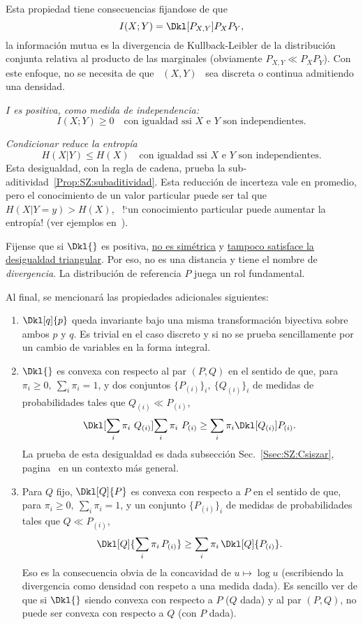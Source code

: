 Esta propiedad tiene consecuencias fijandose de que
%
\[
I(X;Y) = \Dkl[P_{X,Y}]{P_X P_Y},
\]
%
\ie  la  informaci\'on  mutua  es  la  divergencia  de  Kullback-Leibler  de  la
distribuci\'on  conjunta  relativa al  producto  de  las marginales  (obviamente
$P_{X,Y} \ll P_X P_Y$). Con este enfoque,  no se necesita de que \ $(X,Y)$ \ sea
discreta o continua admitiendo una densidad.
%
\begin{propiedades}
\item\label{Prop:SZ:Ipositive}   {\it   $I$   es   positiva,  como   medida   de
    independencia:}
  \[
  I(X;Y) \ge 0 \quad \mbox{con igualdad ssi $X$ e $Y$ son independientes.}
  \]
%
\item\label{Prop:SZ:condicionar} {\it  Condicionar reduce la  entrop\'ia}
  \[
  H(X|Y) \le H(X) \quad \mbox{con igualdad ssi $X$ e $Y$ son independientes.}
  \]
  Esta    desigualdad,     con    la     regla    de    cadena,     prueba    la
  sub-aditividad~\ref{Prop:SZ:subaditividad}.   Esta  reducci\'on  de  incerteza
  vale en  promedio, pero el conocimiento  de un valor particular  puede ser tal
  que $H(X|Y =  y) > H(X)$, \ie \ !`un conocimiento  particular puede aumentar la
  entrop\'ia!  (ver ejemplos en~\cite[p.~59]{Rio07}).
\end{propiedades}

Fijense  que   si  $\Dkl{}$  es   positiva,  \underline{no  es   sim\'etrica}  y
\underline{tampoco  satisface la  desigualdad triangular}.  Por eso,  no  es una
distancia  y  tiene  el  nombre  de {\it  divergencia}.   La  distribuci\'on  de
referencia $P$ juega un rol fundamental.

Al  final, se mencionar\'a las propiedades adicionales siguientes:
%
\begin{enumerate}
\item $\Dkl[q]{p}$  queda invariante  bajo una misma  transformaci\'on biyectiva
  sobre  ambos $p$ y  $q$. Es  trivial en  el caso  discreto y  si no  se prueba
  sencillamente por un cambio de variables en la forma integral.
%
\item $\Dkl{}$ es convexa con respecto al par $(P,Q)$ en el sentido de que, para
  $\pi_i \ge 0,  \: \sum_i \pi_i = 1$,  y dos conjuntos $\{ P_{(i)}  \}_i, \: \{
  Q_{(i)} \}_i$ de medidas de probabilidades tales que $Q_{(i)} \ll P_{(i)}$,
  \[
  \Dkl[\sum_i   \pi_i  \ Q_{(i)}]{\sum_i   \pi_i \   P_{(i)}}  \ge   \sum_i   \pi_i
  \Dkl[Q_{(i)}]{P_{(i)}}.
  \]
  La  prueba de  esta desigualdad  es dada  subsecci\'on Sec.~\ref{Ssec:SZ:Csiszar},
  pagina~\pageref{Ssec:SZ:Csiszar} en un contexto m\'as general.
%
\item Para $Q$ fijo, $\Dkl[Q]{P}$ es convexa con respecto a $P$ en el sentido de
  que, para $\pi_i \ge 0, \: \sum_i  \pi_i = 1$, y un conjunto $\{ P_{(i)} \}_i$
  de medidas de probabilidades tales que $Q \ll P_{(i)}$,
  \[
  \Dkl[Q]{\sum_i   \pi_i \,   P_{(i)}}  \ge   \sum_i   \pi_i
  \, \Dkl[Q]{P_{(i)}}.
  \]
  Eso  es  la  consecuencia  obvia  de  la concavidad  de  $u  \mapsto  \log  u$
  (escribiendo la divergencia  como densidad con respeto a  una medida dada). Es
  sencillo ver de que si $\Dkl{}$ siendo convexa con respecto a $P$ ($Q$ dada) y
  al par $(P,Q)$, no puede ser convexa con respecto a $Q$ (con $P$ dada).
\end{enumerate}
